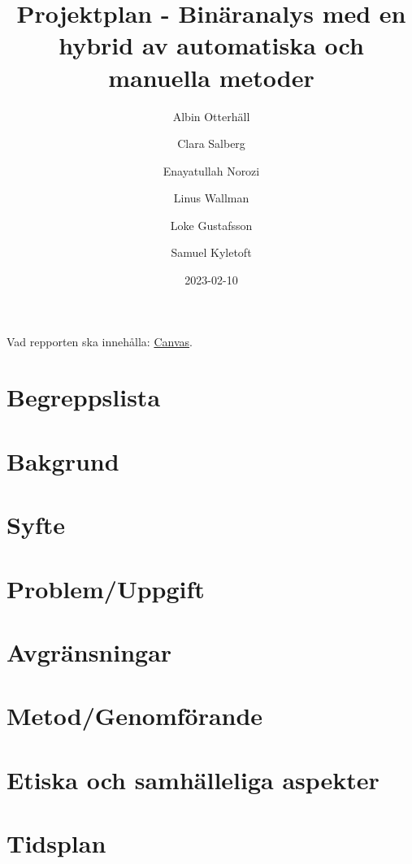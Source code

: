 \documentclass[12pt, a4paper]{article}
\title{Projektplan - Binäranalys med en hybrid av automatiska och manuella metoder}
\author{
    Albin Otterhäll \and
    Clara Salberg \and
    Enayatullah Norozi \and
    Linus Wallman \and
    Loke Gustafsson \and
    Samuel Kyletoft
}
\date{2023-02-10}
\begin{document}
%
\newcommand{\stoe}{S$^2$E}

\maketitle

\newpage

\listoftodos
\newpage

\tableofcontents
\newpage

Vad repporten ska innehålla:
\href{https://chalmers.instructure.com/courses/22323/assignments/66457?module_item_id=337856}{Canvas}.


\section{Begreppslista}


\section{Bakgrund}


\section{Syfte}


\section{Problem/Uppgift}


\section{Avgränsningar}


\section{Metod/Genomförande}


\section{Etiska och samhälleliga aspekter}


\section{Tidsplan}


\end{document}

